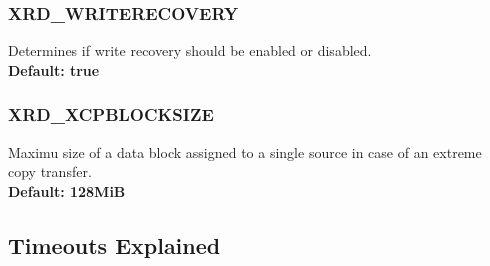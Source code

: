 \documentclass{article}
\begin{document}
		\subsubsection{XRD_WRITERECOVERY}
		\label{env:writerecovery}
			Determines if write recovery should be enabled or disabled. \\
			\textbf{Default: true}

		\subsubsection{XRD_XCPBLOCKSIZE}
		\label{env:xcpblocksize}
		    Maximu size of a data block assigned to a single source in case of an extreme copy transfer. \\
		    \textbf{Default: 128MiB}

    
	\subsection{Timeouts Explained}
		
\end{document}
